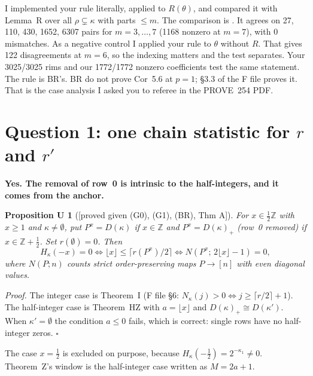 \documentclass[10pt]{amsart}
\newcommand{\file}[1]{{\footnotesize\texttt{\detokenize{#1}}}}
\newcommand{\grade}[1]{\textsf{[#1]}}
\newtheorem*{prop}{Proposition U}
\theoremstyle{remark}
\begin{document}
I implemented your rule literally, applied to $R(\theta)$, and compared it with Lemma~R over all $\rho\subsetneq\kappa$
with parts $\le m$. The comparison is \file{f_compare.py}. It agrees on 27, 110, 430, 1652, 6307 pairs for $m=3,\dots,7$
(1168 nonzero at $m=7$), with 0 mismatches. As a negative control I applied your rule to $\theta$ without $R$. That
gives 122 disagreements at $m=6$, so the indexing matters and the test separates. Your 3025/3025 rims and our
1772/1772 nonzero coefficients test the same statement. The rule is BR's. BR do not prove Cor~5.6 at $p=1$; \S3.3 of the
F file proves it. That is the case analysis I asked you to referee in the PROVE~254 PDF.

\section{Question 1: one chain statistic for $r$ and $r'$}
\textbf{Yes. The removal of row~0 is intrinsic to the half-integers, and it comes from the anchor.}

\begin{prop}[\grade{proved given (G0), (G1), (BR), Thm A}]
For $x\in\tfrac12\mathbb Z$ with $x\ge1$ and $\kappa\ne\emptyset$, put
$P^x=D(\kappa)$ if $x\in\mathbb Z$ and $P^x=D(\kappa)_+$ (row~0 removed) if $x\in\mathbb Z+\tfrac12$. Set $r(\emptyset)=0$. Then
\[
H_\kappa(-x)=0\iff \lfloor x\rfloor\le\lceil r(P^x)/2\rceil
\iff N(P^x;\,2\lfloor x\rfloor-1)=0 ,
\]
where $N(P;n)$ counts strict order-preserving maps $P\to[n]$ with even diagonal values.
\end{prop}
\emph{Proof.} The integer case is Theorem~I (F file \S6: $N_\kappa(j)>0\iff j\ge\lceil r/2\rceil+1$). The half-integer case
is Theorem~HZ with $a=\lfloor x\rfloor$ and $D(\kappa)_+\cong D(\kappa')$. When $\kappa'=\emptyset$ the condition
$a\le0$ fails, which is correct: single rows have no half-integer zeros. $\square$

The case $x=\tfrac12$ is excluded on purpose, because $H_\kappa(-\tfrac12)=2^{-\kappa_1}\ne0$. Theorem~Z's window is the
half-integer case written as $M=2a+1$.
\end{document}
